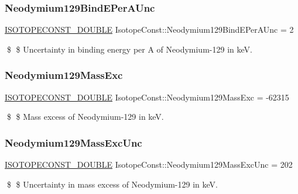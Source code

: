 \subsubsection{\texorpdfstring{Neodymium129\+Bind\+E\+Per\+A\+Unc}{Neodymium129BindEPerAUnc}}
{\footnotesize\ttfamily \mbox{\hyperlink{group___isotope_const-_macros_ga8f45a7272ce02c0b4c65c44636ed719a}{I\+S\+O\+T\+O\+P\+E\+C\+O\+N\+S\+T\+\_\+\+D\+O\+U\+B\+LE}} Isotope\+Const\+::\+Neodymium129\+Bind\+E\+Per\+A\+Unc = 2}

\$ \$ Uncertainty in binding energy per A of Neodymium-\/129 in keV. \mbox{\label{group___isotope_const-_neodymium-_nd129_ga328538623762d9267c9f7e622a8d7821}} 
\subsubsection{\texorpdfstring{Neodymium129\+Mass\+Exc}{Neodymium129MassExc}}
{\footnotesize\ttfamily \mbox{\hyperlink{group___isotope_const-_macros_ga8f45a7272ce02c0b4c65c44636ed719a}{I\+S\+O\+T\+O\+P\+E\+C\+O\+N\+S\+T\+\_\+\+D\+O\+U\+B\+LE}} Isotope\+Const\+::\+Neodymium129\+Mass\+Exc = -\/62315}

\$ \$ Mass excess of Neodymium-\/129 in keV. \mbox{\label{group___isotope_const-_neodymium-_nd129_ga29a19237efd9a644a5ba708f18779507}} 
\subsubsection{\texorpdfstring{Neodymium129\+Mass\+Exc\+Unc}{Neodymium129MassExcUnc}}
{\footnotesize\ttfamily \mbox{\hyperlink{group___isotope_const-_macros_ga8f45a7272ce02c0b4c65c44636ed719a}{I\+S\+O\+T\+O\+P\+E\+C\+O\+N\+S\+T\+\_\+\+D\+O\+U\+B\+LE}} Isotope\+Const\+::\+Neodymium129\+Mass\+Exc\+Unc = 202}

\$ \$ Uncertainty in mass excess of Neodymium-\/129 in keV. \mbox{\label{group___isotope_const-_neodymium-_nd129_ga0167a27338a43ba6e670f63eb79b360c}} 
